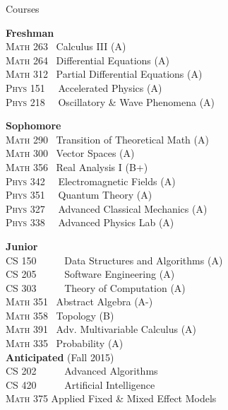 \documentclass{resume} %
\begin{document}

\begin{rSection}{Courses}


\setlength{\columnsep}{1cm}
\begin{multicols}{2}

\textbf{Freshman}\\
\textsc{Math 263} 	 \	Calculus III (A)\\
\textsc{Math 264} 	 \	Differential Equations (A)\\
\textsc{Math 312} 	 \	Partial Differential Equations (A)\\
\textsc{Phys 151} \  \	Accelerated Physics (A)\\
\textsc{Phys 218} \  \	Oscillatory \& Wave Phenomena (A)

\textbf{Sophomore}\\
\textsc{Math 290} 	 \	Transition of Theoretical Math (A)\\
\textsc{Math 300} 	 \	Vector Spaces (A)\\
\textsc{Math 356} 	 \	Real Analysis I (B+)\\
\textsc{Phys 342} \	 \	Electromagnetic Fields (A)\\
\textsc{Phys 351} \	 \	Quantum Theory (A)\\
\textsc{Phys 327} \	 \	Advanced Classical Mechanics (A)\\
\textsc{Phys 338} \	 \	Advanced Physics Lab (A)

\textbf{Junior}\\
\textsc{CS 150} \ \ \ \  \	Data Structures and Algorithms (A)\\
\textsc{CS 205} \ \ \ \	 \	Software Engineering (A)\\
\textsc{CS 303} \ \ \ \	 \	Theory of Computation (A)\\
\textsc{Math 351} 		 \	Abstract Algebra (A-)\\
\textsc{Math 358} 		 \	Topology (B)\\
\textsc{Math 391} 		 \	Adv. Multivariable Calculus (A)\\
\textsc{Math 335} 		 \	Probability (A)\\

\textbf{Anticipated} (Fall 2015)\\
\textsc{CS 202} \ \ \ \	 \	Advanced Algorithms\\
\textsc{CS 420} \ \ \ \	 \	Artificial Intelligence\\
\textsc{Math 375} 		 Applied Fixed \& Mixed Effect Models\\


\end{multicols}

\end{rSection}
\end{document}
